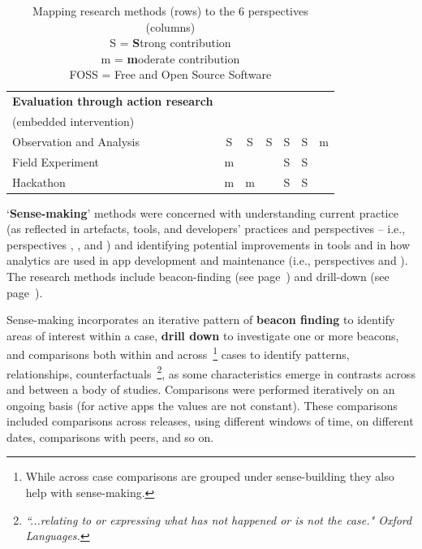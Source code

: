 \begin{table}
\begin{tabular}{l|ccc|ccc}
        \hline
        \textbf{Evaluation through action research} & & & & & & \\
        (embedded intervention)  & & & & & &  \\
        Observation and Analysis &S &S &S &S &S &m \\
        Field Experiment         &m &  &  &S &S &  \\
        Hackathon                &m &m &  &S &S &  \\
        
        \bottomrule
    \end{tabular}
    \caption[Mapping research methods (rows) to the 6 perspectives (columns)]{Mapping research methods (rows) to the 6 perspectives (columns) \\ S = \textbf{S}trong contribution \\ m = \textbf{m}oderate contribution \\FOSS = Free and Open Source Software}
    \label{tab:mapping-analysis-to-six-perspectives}
\end{table}

`\textbf{Sense-making}' methods were concerned with understanding current practice (as reflected in artefacts, tools, and developers' practices and perspectives -- i.e., perspectives \uartefacts, \utools, and \uuse) and identifying potential improvements in tools and in how analytics are used in app development and maintenance (i.e., perspectives \itools and \iartefacts). The research methods include beacon-finding (see page~\pageref{section-beacon-finding-method}) and drill-down (see page~\pageref{drill-down-research-method}).

Sense-making incorporates an iterative pattern of \textbf{beacon finding} to identify areas of interest within a case, \textbf{drill down} to investigate one or more beacons, and comparisons both within and across~\footnote{While across case comparisons are grouped under sense-building they also help with sense-making.} cases to identify patterns, relationships, counterfactuals~\footnote{\emph{``...relating to or expressing what has not happened or is not the case." Oxford Languages.}}, as some characteristics emerge in contrasts across and between a body of studies. 
%
Comparisons were performed iteratively on an ongoing basis (for active apps the values are not constant). These comparisons included comparisons across releases, using different windows of time, on different dates, comparisons with peers, and so on.


